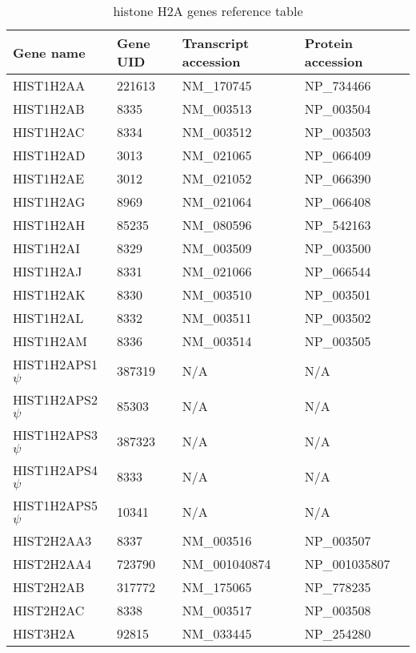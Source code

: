 \begin{table}
  \centering
  \begin{tabular}{l | l | l | l }
    Gene name & Gene UID & Transcript accession & Protein accession \\
    \hline
     HIST1H2AA & 221613 & NM\_170745 & NP\_734466 \\
     HIST1H2AB & 8335 & NM\_003513 & NP\_003504 \\
     HIST1H2AC & 8334 & NM\_003512 & NP\_003503 \\
     HIST1H2AD & 3013 & NM\_021065 & NP\_066409 \\
     HIST1H2AE & 3012 & NM\_021052 & NP\_066390 \\
     HIST1H2AG & 8969 & NM\_021064 & NP\_066408 \\
     HIST1H2AH & 85235 & NM\_080596 & NP\_542163 \\
     HIST1H2AI & 8329 & NM\_003509 & NP\_003500 \\
     HIST1H2AJ & 8331 & NM\_021066 & NP\_066544 \\
     HIST1H2AK & 8330 & NM\_003510 & NP\_003501 \\
     HIST1H2AL & 8332 & NM\_003511 & NP\_003502 \\
     HIST1H2AM & 8336 & NM\_003514 & NP\_003505 \\
     HIST1H2APS1 $\psi$ & 387319 & N/A & N/A \\
     HIST1H2APS2 $\psi$ & 85303 & N/A & N/A \\
     HIST1H2APS3 $\psi$ & 387323 & N/A & N/A \\
     HIST1H2APS4 $\psi$ & 8333 & N/A & N/A \\
     HIST1H2APS5 $\psi$ & 10341 & N/A & N/A \\
     HIST2H2AA3 & 8337 & NM\_003516 & NP\_003507 \\
     HIST2H2AA4 & 723790 & NM\_001040874 & NP\_001035807 \\
     HIST2H2AB & 317772 & NM\_175065 & NP\_778235 \\
     HIST2H2AC & 8338 & NM\_003517 & NP\_003508 \\
     HIST3H2A & 92815 & NM\_033445 & NP\_254280 \\
  \end{tabular}
  \caption{histone H2A genes reference table}
  \label{tab:h2a-ref}
\end{table}
